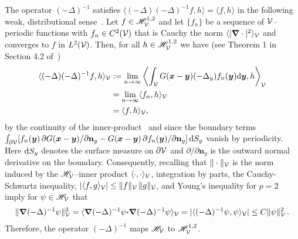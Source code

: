 \documentclass[amsa]{ipart}
\begin{document}
The operator $(-\Delta)^{-1}$ satisfies $\langle(-\Delta)(-\Delta)^{-1}f,h\rangle=\langle f,h\rangle$ in the
following weak, distributional
sense~\cite{McOwen:2003:PDE,Folland:95:PDEs}. Let
$f\in\mathscr{H}^{1,2}_{\mathcal{V}}$ and let $\{ f_n\}$ be a sequence of
$\mathcal{V}$--periodic functions with $f_n\in C^2(\mathcal{V})$ that is Cauchy the norm
$\langle|\mbox{\boldmath${\nabla}$}\cdot|^2\rangle_{\mathcal{V}}$ and converges to $f$ in 
$L^2(\mathcal{V})$. Then, for all $h\in\mathscr{H}^{1,2}_{\mathcal{V}}$ we have  (see
Theorem 1 in Section 4.2 of~\cite{McOwen:2003:PDE})      
%
\begin{align}\label{eq:Weak_Delta_1}
  \langle(-\Delta)(-\Delta)^{-1}f,h\rangle_{\Vc}
  &:=\lim_{n\to\infty}\left\langle\int_{\Vc} G(\vecx-\vecy)(-\Delta_y)f_n(\vecy)\d\vecy,h\right\rangle_{\Vc}
  \\\notag
  &=\lim_{n\to\infty}\langle f_n,h\rangle_{\Vc}
  \\\notag
  &=\langle f,h\rangle_{\Vc},
  \notag
\end{align}
%
by the continuity of the inner-product~\cite{Folland:99:RealAnalysis}
and since the boundary terms~\cite{McOwen:2003:PDE}
$\int_{\partial\mathcal{V}}[f_n(\boldsymbol{y})\,\partial G(\boldsymbol{x}-\boldsymbol{y})/\partial\mathbf{n}_y
-G(\boldsymbol{x}-\boldsymbol{y})\,\partial f_n(\boldsymbol{y})/\partial\mathbf{n}_y]\,\mathrm{d} S_y$ vanish by   
periodicity. Here $\mathrm{d} S_y$ denotes the surface measure on $\partial\mathcal{V}$ and
$\partial/\partial\mathbf{n}_y$ is the outward normal derivative on the
boundary. Consequently, recalling that $\|\cdot\|_{\mathcal{V}}$ is the norm  
induced by the $\mathscr{H}_{\mathcal{V}}$--inner product $\langle\cdot,\cdot\rangle_{\mathcal{V}}$, integration
by parts, the Cauchy-Schwartz inequality, $|\langle
f,g\rangle_{\mathcal{V}}|\leq\|f\|_{\mathcal{V}}\,\|g\|_{\mathcal{V}}$, and Young's inequality for $p=2$
imply for $\psi\in\mathscr{H}_{\mathcal{V}}$ that  
%
\begin{align}\label{eq:L2_to_H1}
  \|\bnabla(-\Delta)^{-1}\psi\|^2_{\Vc}=\langle\bnabla(-\Delta)^{-1}\psi\bcdot\bnabla(-\Delta)^{-1}\psi\rangle_{\Vc}
              =|\langle(-\Delta)^{-1}\psi,\psi\rangle_{\Vc}|
              \leq C\|\psi\|_{\Vc}^2\,.
\end{align}
%
Therefore, the operator $(-\Delta)^{-1}$ maps $\mathscr{H}_{\mathcal{V}}$ to
$\mathscr{H}^{1,2}_{\mathcal{V}}$. 
\end{document}
